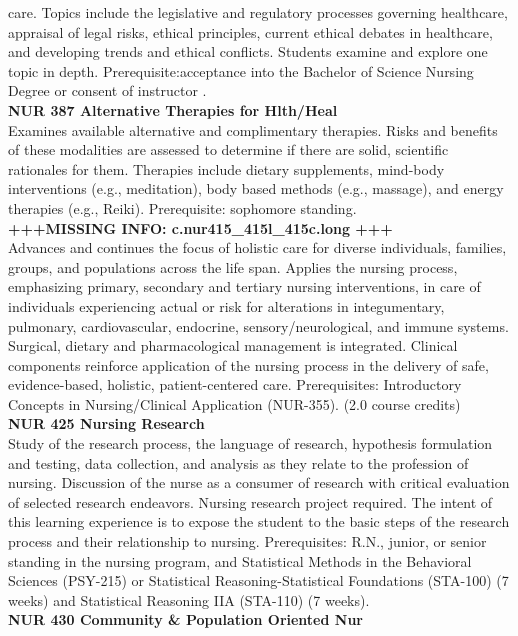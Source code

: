 \documentclass[
  letterpaper,
]{scrbook}
\begin{document}
care. Topics include the legislative and regulatory processes governing
healthcare, appraisal of legal risks, ethical principles, current
ethical debates in healthcare, and developing trends and ethical
conflicts. Students examine and explore one topic in depth.
Prerequisite:acceptance into the Bachelor of Science Nursing Degree or
consent of instructor .\\
\textbf{NUR 387 Alternative Therapies for Hlth/Heal}\\
Examines available alternative and complimentary therapies. Risks and
benefits of these modalities are assessed to determine if there are
solid, scientific rationales for them. Therapies include dietary
supplements, mind-body interventions (e.g., meditation), body based
methods (e.g., massage), and energy therapies (e.g., Reiki).
Prerequisite: sophomore standing.\\
\textbf{+++MISSING INFO: c.nur415\_415l\_415c.long +++}\\
Advances and continues the focus of holistic care for diverse
individuals, families, groups, and populations across the life span.
Applies the nursing process, emphasizing primary, secondary and tertiary
nursing interventions, in care of individuals experiencing actual or
risk for alterations in integumentary, pulmonary, cardiovascular,
endocrine, sensory/neurological, and immune systems. Surgical, dietary
and pharmacological management is integrated. Clinical components
reinforce application of the nursing process in the delivery of safe,
evidence-based, holistic, patient-centered care. Prerequisites:
Introductory Concepts in Nursing/Clinical Application (NUR-355). (2.0
course credits)\\
\textbf{NUR 425 Nursing Research}\\
Study of the research process, the language of research, hypothesis
formulation and testing, data collection, and analysis as they relate to
the profession of nursing. Discussion of the nurse as a consumer of
research with critical evaluation of selected research endeavors.
Nursing research project required. The intent of this learning
experience is to expose the student to the basic steps of the research
process and their relationship to nursing. Prerequisites: R.N., junior,
or senior standing in the nursing program, and Statistical Methods in
the Behavioral Sciences (PSY-215) or Statistical Reasoning-Statistical
Foundations (STA-100) (7 weeks) and Statistical Reasoning IIA (STA-110)
(7 weeks).\\
\textbf{NUR 430 Community \& Population Oriented Nur}\\
\end{document}
